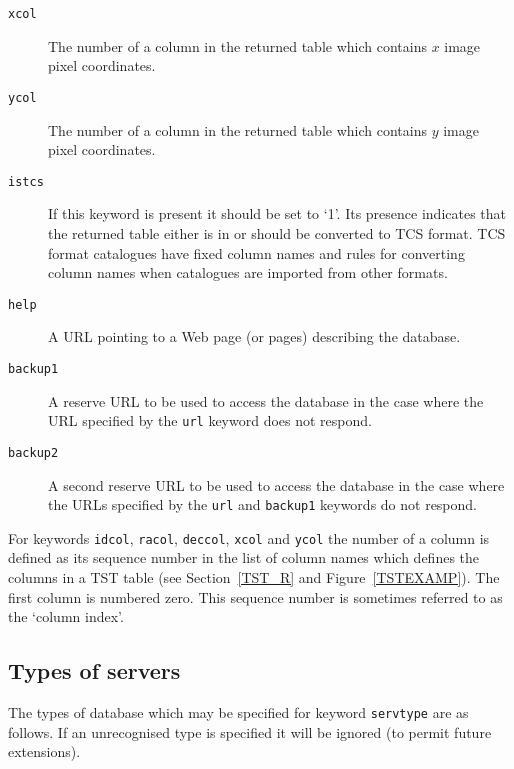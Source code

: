 \documentclass[twoside,11pt]{article}
\renewcommand{\_}{\texttt{\symbol{95}}}
\begin{document}
\begin{description}
  \item[{\tt x\_col}] The number of a column in the returned table
   which contains $x$\/ image pixel coordinates.

  \item[{\tt y\_col}] The number of a column in the returned table
   which contains $y$\/ image pixel coordinates.

  \item[{\tt is\_tcs}] If this keyword is present it should be set to
   `1'.  Its presence indicates that the returned table either is in or
   should be converted to TCS format.  TCS format catalogues have fixed
   column names and rules for converting column names when catalogues
   are imported from other formats.

  \item[{\tt help}] A URL pointing to a Web page (or pages) describing
   the database.

  \item[{\tt backup1}] A reserve URL to be used to access the database
   in the case where the URL specified by the {\tt url} keyword does
   not respond.

  \item[{\tt backup2}] A second reserve URL to be used to access the
   database in the case where the URLs specified by the {\tt url} and
   {\tt backup1} keywords do not respond.

\end{description}

For keywords {\tt id\_col}, {\tt ra\_col}, {\tt dec\_col}, {\tt x\_col}
and {\tt y\_col} the number of a column is defined as its sequence
number in the list of column names which defines the columns in a TST
table (see Section~\ref{TST_R} and Figure~\ref{TSTEXAMP}).  The first
column is numbered zero.  This sequence number is sometimes referred
to as the `column index'.

\subsection{\label{SERVERS_R}Types of servers}

The types of database which may be specified for keyword {\tt serv\_type}
are as follows.  If an unrecognised type is specified it will be ignored
(to permit future extensions).
\end{document}

